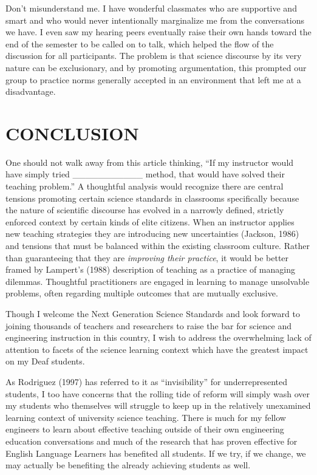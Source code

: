 \documentclass[11.5pt]{sig-alternate} %
\begin{document}
\begin{large}
Don’t misunderstand me.  I have wonderful classmates who are supportive and smart and who would never intentionally marginalize me from the conversations we have.  I even saw my hearing peers eventually raise their own hands toward the end of the semester to be called on to talk, which helped the flow of the discussion for all participants. The problem is that science discourse by its very nature can be exclusionary, and by promoting argumentation, this prompted our group to practice norms generally accepted in an environment that left me at a disadvantage.

\section*{CONCLUSION}

One should not walk away from this article thinking, “If my instructor would have simply tried \_\_\_\_\_\_\_\_\_\_\_ method, that would have solved their teaching problem.”  A thoughtful analysis would recognize there are central tensions promoting certain science standards in classrooms specifically because the nature of scientific discourse has evolved in a narrowly defined, strictly enforced context by certain kinds of elite citizens.  When an instructor applies new teaching strategies they are introducing new uncertainties (Jackson, 1986) and tensions that must be balanced within the existing classroom culture.  Rather than guaranteeing that they are \textit{improving their practice}, it would be better framed by Lampert’s (1988) description of teaching as a practice of managing dilemmas.  Thoughtful practitioners are engaged in learning to manage unsolvable problems, often regarding multiple outcomes that are mutually exclusive. 

Though I welcome the Next Generation Science Standards and look forward to joining thousands of teachers and researchers to raise the bar for science and engineering instruction in this country, I wish to address the overwhelming lack of attention to facets of the science learning context which have the greatest impact on my Deaf students. 

As Rodriguez (1997) has referred to it as “invisibility” for underrepresented students, I too have concerns that the rolling tide of reform will simply wash over my students who themselves will struggle to keep up in the relatively unexamined learning context of university science teaching.  There is much for my fellow engineers to learn about effective teaching outside of their own engineering education conversations and much of the research that has proven effective for English Language Learners has benefited all students.  If we try, if we change, we may actually be benefiting the already achieving students as well. 


\end{large}
\end{document}
